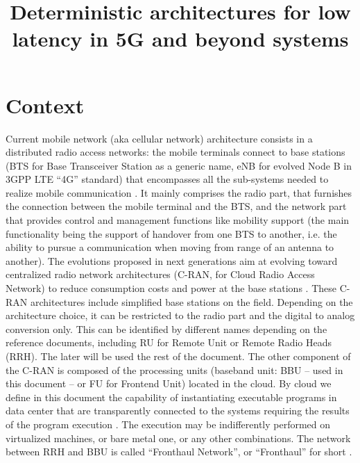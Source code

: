 \documentclass{article}
\begin{document}
\title{Deterministic architectures for low latency in 5G and beyond systems}


\maketitle

\section*{Context}

 Current mobile network (aka cellular network) architecture consists in a distributed radio access networks: the mobile terminals connect to base stations (BTS for Base Transceiver Station as a generic name, eNB for evolved Node B in 3GPP LTE “4G” standard) that encompasses all the sub-systems needed to realize mobile communication \cite{bouguen2012lte}. 
 It mainly comprises the radio part, that furnishes the connection between the mobile terminal and the BTS, and the network part that provides control and management functions like mobility support (the main functionality being the support of handover from one BTS to another, i.e. the ability to pursue a communication when moving from range of an antenna to another). The evolutions proposed in next generations aim at evolving toward centralized radio network architectures (C-RAN, for Cloud Radio Access Network) to reduce consumption costs and power at the base stations \cite{mobile2011c}. These C-RAN architectures include simplified base stations on the field. Depending on the architecture choice, it can be restricted to the radio part and the digital to analog conversion only. This can be identified by different names depending on the reference documents, including RU for Remote Unit or Remote Radio Heads (RRH). The later will be used the rest of the document. The other component of the C-RAN is composed of the processing units (baseband unit: BBU – used in this document – or FU for Frontend Unit) located in the cloud. By cloud we define in this document the capability of instantiating executable programs in data center that are transparently connected to the systems  requiring the results of the program execution \cite{mobile2011c}. The execution may be indifferently performed on virtualized machines, or bare metal one, or any other combinations. The network between RRH and BBU is called “Fronthaul Network”, or ``Fronthaul'' for short \cite{ieeep802}.\\
\end{document}
